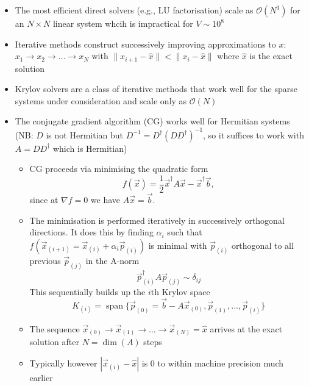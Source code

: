 \begin{itemize}
    \item The most efficient direct solvers (e.g., LU factorisation) scale as $\mathcal{O}(N^3)$ for an $N \times N$ linear system whcih is impractical for $V \sim 10^8$
    \item Iterative methods  construct successively improving approximations to $x$: $x_1 \rightarrow x_2 \rightarrow \ldots \rightarrow x_N$ with $\|x_{i+1} - \hat{x} \| < \|x_{i} - \hat{x} \|$ where $\hat{x}$ is the exact solution
    \item Krylov solvers are a class of iterative methods that work well for the sparse systems under consideration and scale only as $\mathcal{O}(N)$
    \item The conjugate gradient algorithm (CG) works well for Hermitian systems (NB: $D$ is not Hermitian but $D^{-1} = D^\dagger (D D^\dagger)^{-1}$, so it suffices to work with $A = D D^\dagger$ which is Hermitian)
    \begin{itemize}
        \item CG proceeds via minimising the quadratic form
        \begin{equation}
            f(\vec{x}) = \frac{1}{2}\vec{x}^\dagger A \vec{x} - \vec{x}^\dagger\vec{b},
        \end{equation}
        since at $\nabla f = 0$ we have $A \vec{x} = \vec{b}$.
        \item The minimisation is performed iteratively in successively orthogonal directions. It does this by finding $\alpha_i$ such that $f(\vec{x}_{(i+1)}=\vec{x}_{(i)}+\alpha_i\vec{p}_{(i)})$ is minimal with $\vec{p}_{(i)}$ orthogonal to all previous $\vec{p}_{(j)}$ in the A-norm
        \begin{equation}
            \vec{p}_{(i)}^\dagger A \vec{p}_{(j)} \sim \delta_{ij}
        \end{equation}
        This sequentially builds up the $i$th Krylov space
        \begin{equation}
            K_{(i)} = \operatorname{span}\{\vec{p}_{(0)} = \vec{b} - A \vec{x}_{(0)}, \vec{p}_{(1)}, \ldots, \vec{p}_{(i)}\}
        \end{equation}
        \item The sequence $\vec{x}_{(0)} \rightarrow \vec{x}_{(1)} \rightarrow \ldots \rightarrow \vec{x}_{(N)} = \hat{x}$ arrives at the exact solution after $N = \operatorname{dim}(A)$ steps
        \item Typically however $|\vec{x}_{(i)} - \hat{x}|$ is $0$ to within machine precision much earlier
    \end{itemize}
\end{itemize}


